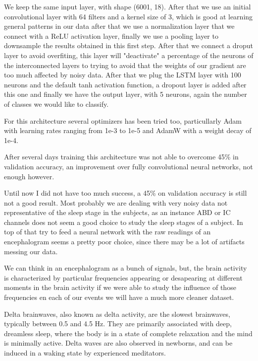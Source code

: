 We keep the same input layer, with shape (6001, 18). After that we use an initial convolutional layer with 64 filters and a kernel size of 3, which is good at learning general patterns in our data after that we use a normalization layer that we connect with a ReLU activation layer, finally we use a pooling layer to downsample the results obtained in this first step. After that we connect a droput layer to avoid overfiting, this layer will "deactivate" a percentage of the neurons of the interconnected layers to trying to avoid that the weights of our gradient are too much affected by noisy data. After that we plug the LSTM layer with 100 neurons and the default tanh activation function, a dropout layer is added after this one and finally we have the output layer, with 5 neurons, again the number of classes we would like to classify.

For this architecture several optimizers has been tried too, particullarly Adam with learning rates ranging from 1e-3 to 1e-5 and AdamW with a weight decay of 1e-4.

After several days training this architecture was not able to overcome 45\% in validation accuracy, an improvement over fully convolutional neural networks, not enough however.

Until now I did not have too much success, a 45\% on validation accuracy is still not a good result. Most probably we are dealing with very noisy data not representative of the sleep stage in the subjects, as an instance ABD or IC channels does not seem a good choice to study the sleep stages of a subject. In top of that try to feed a neural network with the raw readings of an encephalogram seems a pretty poor choice, since there may be a lot of artifacts messing our data.

We can think in an encephalogram as a bunch of signals, but, the brain activity is characterized by particular frequencies appearing or desapearing at different moments in the brain activity if we were able to study the influence of those frequencies en each of our events we will have a much more cleaner dataset.

Delta brainwaves, also known as delta activity, are the slowest brainwaves, typically between 0.5 and 4.5 Hz. They are primarily associated with deep, dreamless sleep, where the body is in a state of complete relaxation and the mind is minimally active. Delta waves are also observed in newborns, and can be induced in a waking state by experienced meditators.

